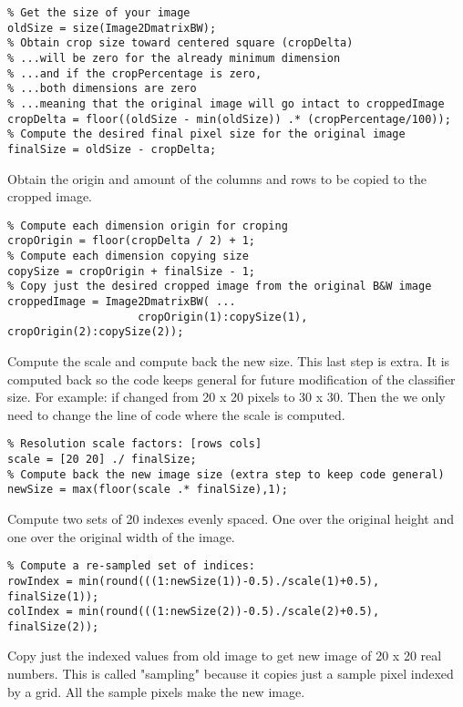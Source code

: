 \begin{verbatim}
% Get the size of your image
oldSize = size(Image2DmatrixBW);
% Obtain crop size toward centered square (cropDelta)
% ...will be zero for the already minimum dimension
% ...and if the cropPercentage is zero, 
% ...both dimensions are zero
% ...meaning that the original image will go intact to croppedImage
cropDelta = floor((oldSize - min(oldSize)) .* (cropPercentage/100));
% Compute the desired final pixel size for the original image
finalSize = oldSize - cropDelta;
\end{verbatim}

Obtain the origin and amount of the columns and rows to be copied to the cropped image.
\begin{verbatim}
% Compute each dimension origin for croping
cropOrigin = floor(cropDelta / 2) + 1;
% Compute each dimension copying size
copySize = cropOrigin + finalSize - 1;
% Copy just the desired cropped image from the original B&W image
croppedImage = Image2DmatrixBW( ...
                    cropOrigin(1):copySize(1), cropOrigin(2):copySize(2));
\end{verbatim}
Compute the scale and compute back the new size. This last step is extra. It is computed back so the code keeps general for future modification of the classifier size. For example: if changed from 20 x 20 pixels to 30 x 30. Then the we only need to change the line of code where the scale is computed.
\begin{verbatim}
% Resolution scale factors: [rows cols]
scale = [20 20] ./ finalSize;
% Compute back the new image size (extra step to keep code general)
newSize = max(floor(scale .* finalSize),1); 
\end{verbatim}
Compute two sets of 20 indexes evenly spaced. One over the original height and one over the original width of the image.

\begin{verbatim}
% Compute a re-sampled set of indices:
rowIndex = min(round(((1:newSize(1))-0.5)./scale(1)+0.5), finalSize(1));
colIndex = min(round(((1:newSize(2))-0.5)./scale(2)+0.5), finalSize(2));
\end{verbatim}
Copy just the indexed values from old image to get new image of 20 x 20 real numbers. This is called "sampling" because it copies just a sample pixel indexed by a grid. All the sample pixels make the new image.

